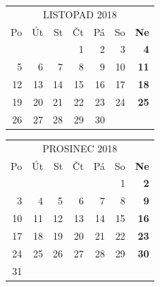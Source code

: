\documentclass{article}
\begin{document}
\selectfont
\def\arraystretch{1.75}
\tabcolsep=10pt
\begin{tabular}{*6{r}>{\bfseries}r}
\multicolumn{7}{c}{LISTOPAD 2018}\\
\rowcolor[gray]{.75} Po & Út & St & Čt & Pá & So & Ne \\
\hline
                        &    &    & 1  & 2  & 3  & 4  \\
                     5  & 6  & 7  & 8  & 9  & 10 & 11 \\
                     12 & 13 & 14 & 15 & 16 & 17 & 18 \\
                     19 & 20 & 21 & 22 & 23 & 24 & 25 \\
                     26 & 27 & 28 & 29 & 30 &    &    \\
\end{tabular}

\newpage
\begin{table}[t!]
\centering
{}
\end{table}

\selectfont
\def\arraystretch{1.75}
\tabcolsep=10pt
\begin{tabular}{*6{r}>{\bfseries}r}
\multicolumn{7}{c}{PROSINEC 2018}\\
\rowcolor[gray]{.75} Po & Út & St & Čt & Pá & So & Ne \\
\hline
                        &    &    &    &    & 1  & 2  \\
                     3  & 4  & 5  & 6  & 7  & 8  & 9  \\
                     10 & 11 & 12 & 13 & 14 & 15 & 16 \\
                     17 & 18 & 19 & 20 & 21 & 22 & 23 \\
                     24 & 25 & 26 & 27 & 28 & 29 & 30 \\
                     31 &    &    &    &    &    &    \\
\end{tabular}
\end{document}
